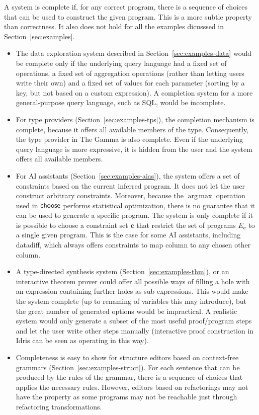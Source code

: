 \documentclass[ a4paper,UKenglish,cleveref, autoref, thm-restate]{lipics-v2021}
\newcommand{\ident}[1]{\textsf{#1}}
\newcommand{\select}{\textnormal{\ident{choose}}}
\DeclareMathOperator{\argmax}{arg\,max}
\begin{document}
A system is complete if, for any correct program, there is a sequence of choices that can be
used to construct the given program. This is a more subtle property than correctness. It also
does not hold for all the examples dicusssed in Section~\ref{sec:examples}.

\begin{itemize}
\setlength{\itemsep}{5pt}
\item The data exploration system described in Section~\ref{sec:examples-data} would be complete
  only if the underlying query language had a fixed set of operations, a fixed set of aggregation
  operations (rather than letting users write their own) and a fixed set of values for each
  parameter (sorting by a key, but not based on a custom expression). A completion system for a
  more general-purpose query language, such as SQL, would be incomplete.

\item For type providers (Section~\ref{sec:examples-tps}), the completion mechanism is complete,
  because it offers all available members of the type. Consequently, the type provider in The
  Gamma is also complete. Even if the underlying query language is more expressive, it is hidden
  from the user and the system offers all available members.

\item For AI assistants (Section~\ref{sec:examples-aias}), the system offers a set of constraints
  based on the current inferred program. It does not let the user construct arbitrary constraints.
  Moreover, because the $\argmax$ operation used in $\select$ performs statistical
  optimization, there is no guarantee that it can be used to generate a specific program.
  The system is only complete if it is possible to choose a constraint set $\boldsymbol{c}$ that
  restrict the set of programs $E_{\boldsymbol{c}}$ to a single given program. This is the case
  for some AI assistants, including datadiff, which always offers constraints to map column to
  any chosen other column.

\item A type-directed synthesis system (Section~\ref{sec:examples-thm}), or an interactive theorem
  prover could offer all possible ways of filling a hole with an expression containing further
  holes as sub-expressions. This would make the system complete (up to renaming of variables this
  may introduce), but the great number of generated options would be impractical. A realistic
  system would only generate a subset of the most useful proof/program steps and let the user write
  other steps manually (interactive proof construction in Idris can be seen as operating in this way).

\item Completeness is easy to show for structure editors based on context-free grammars
  (Section~\ref{sec:examples-struct}). For each sentence that can be produced by the rules of
  the grammar, there is a sequence of choices that applies the necessary rules. However, editors
  based on refactorings may not have the property as some programs may not be reachable just
  through refactoring transformations.
\end{itemize}
\end{document}
